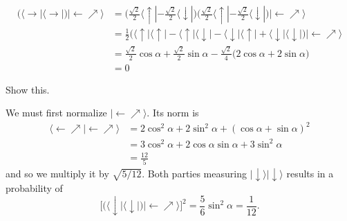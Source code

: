 \documentclass[../road-to-reality.tex]{subfiles}
\begin{document}
\begin{questions}
\begin{solution}
\begin{align*}
				\Big(\langle\rightarrow\!|\langle\rightarrow\!|\Big) |\!\leftarrow\nearrow\rangle &= \Big(\frac{\sqrt{2}}{2}\langle\uparrow\!| - \frac{\sqrt{2}}{2}\langle\downarrow\!|\Big)\Big(\frac{\sqrt{2}}{2}\langle\uparrow\!| - \frac{\sqrt{2}}{2}\langle\downarrow\!|\Big)|\!\leftarrow\nearrow\rangle \\
				&= \frac{1}{2}\Big(\langle\uparrow\!|\langle\uparrow\!| - \langle\uparrow\!|\langle\downarrow\!| - \langle\downarrow\!|\langle\uparrow\!| + \langle\downarrow\!|\langle\downarrow\!|\Big)|\!\leftarrow\nearrow\rangle \\
				&= \frac{\sqrt{2}}{2}\cos\alpha + \frac{\sqrt{2}}{2}\sin\alpha - \frac{\sqrt{2}}{4}\Big(2\cos\alpha + 2\sin\alpha\Big) \\
				&= 0
			\end{align*}
		\end{solution}
	
		\question Show this.
		
		\begin{solution}
			We must first normalize $|\!\leftarrow\nearrow\rangle$. Its norm is
			\begin{align*}
				\langle\leftarrow\nearrow\!|\!\leftarrow\nearrow\rangle &= 2\cos^2\alpha + 2\sin^2\alpha + (\cos\alpha+ \sin\alpha)^2 \\
				&= 3\cos^2\alpha + 2\cos\alpha\sin\alpha + 3\sin^2\alpha \\
				&= \frac{12}{5}
			\end{align*}
			and so we multiply it by $\sqrt{5/12}$. Both parties measuring $|\!\downarrow\rangle|\!\downarrow\rangle$ results in a probability of
			\[
				\Big[\Big(\langle\downarrow\!|\langle\downarrow\!|\Big)|\!\leftarrow\nearrow\rangle\Big]^2 = \frac{5}{6}\sin^2\alpha = \frac{1}{12}.
			\]
		\end{solution}
	\end{questions}
\end{document}
